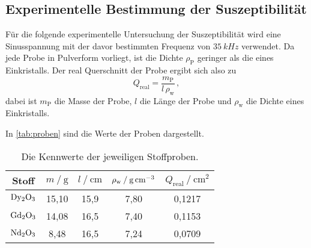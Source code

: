 \subsection{Experimentelle Bestimmung der Suszeptibilität}

Für die folgende experimentelle Untersuchung der Suszeptibilität wird eine Sinusspannung 
mit der davor bestimmten Frequenz von $\qty{35}{kHz}$ verwendet.
Da jede Probe in Pulverform vorliegt, ist die Dichte $\rho_\text{P}$ geringer als die eines Einkristalls.
Der real Querschnitt der Probe ergibt sich also zu
\begin{equation}
  Q_\text{real} = \frac{m_\text{P}}{l \, \rho_\text{w}} \, ,
\end{equation}
dabei ist $m_\text{P}$ die Masse der Probe, $l$ die Länge der Probe und $\rho_\text{w}$ die Dichte eines Einkristalls.

In \autoref{tab:proben} sind die Werte der Proben dargestellt.
\begin{table}
  \centering
  \caption{Die Kennwerte der jeweiligen Stoffproben.}
  \label{tab:proben}
  \begin{tabular}{c c c c c}
    \toprule
    Stoff &   
    $m \mathbin{/} \mathrm{g}$ &
    $l \mathbin{/} \mathrm{cm}$ &
    $\rho_\text{w} \mathbin{/} \unit[per-mode=reciprocal]{\gram\per\cubic\centi\meter}$ & 
    $Q_\text{real} \mathbin{/} \unit{\centi\meter\squared}$ \\
    \midrule
    $\ce{Dy2O3}$ & 15,10 &  15,9 & 7,80 & 0,1217 \\
    $\ce{Gd2O3}$ & 14,08 &  16,5 & 7,40 & 0,1153 \\
    $\ce{Nd2O3}$ &  8,48 &  16,5 & 7,24 & 0,0709 \\
    \bottomrule
  \end{tabular}
\end{table}

